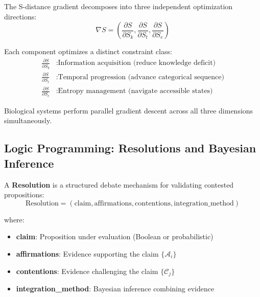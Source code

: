\begin{proposition}
The S-distance gradient decomposes into three independent optimization directions:
\begin{equation}
\nabla S = \left(\frac{\partial S}{\partial S_k}, \frac{\partial S}{\partial S_t}, \frac{\partial S}{\partial S_e}\right)
\end{equation}

Each component optimizes a distinct constraint class:
\begin{align}
\frac{\partial S}{\partial S_k} &: \text{Information acquisition (reduce knowledge deficit)} \\
\frac{\partial S}{\partial S_t} &: \text{Temporal progression (advance categorical sequence)} \\
\frac{\partial S}{\partial S_e} &: \text{Entropy management (navigate accessible states)}
\end{align}

Biological systems perform parallel gradient descent across all three dimensions simultaneously.
\end{proposition}

\subsection{Logic Programming: Resolutions and Bayesian Inference}

\begin{definition}
A \textbf{Resolution} is a structured debate mechanism for validating contested propositions:
\begin{equation}
\text{Resolution} = (\text{claim}, \text{affirmations}, \text{contentions}, \text{integration\_method})
\end{equation}

where:
\begin{itemize}
\item \textbf{claim}: Proposition under evaluation (Boolean or probabilistic)
\item \textbf{affirmations}: Evidence supporting the claim $\{\mathcal{A}_i\}$
\item \textbf{contentions}: Evidence challenging the claim $\{\mathcal{C}_j\}$
\item \textbf{integration\_method}: Bayesian inference combining evidence
\end{itemize}
\end{definition}

